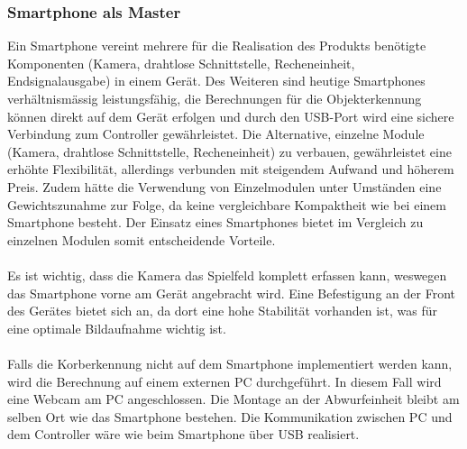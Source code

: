 \subsubsection{Smartphone als Master}
	Ein Smartphone vereint mehrere für die Realisation des Produkts benötigte 
	Komponenten (Kamera, drahtlose Schnittstelle, Recheneinheit, Endsignalausgabe) 
	in einem Gerät. Des Weiteren sind heutige Smartphones verhältnismässig 
	leistungsfähig, die Berechnungen für die Objekterkennung können direkt auf 
	dem Gerät erfolgen und durch den USB-Port wird eine sichere Verbindung zum 
	Controller gewährleistet. Die Alternative, einzelne Module (Kamera, drahtlose 
	Schnittstelle, Recheneinheit) zu verbauen, gewährleistet eine erhöhte 
	Flexibilität, allerdings verbunden mit steigendem Aufwand und höherem Preis. 
	Zudem hätte die Verwendung von Einzelmodulen unter Umständen eine 
	Gewichtszunahme zur Folge, da keine vergleichbare Kompaktheit wie bei einem 
	Smartphone besteht. Der Einsatz eines Smartphones bietet im Vergleich zu 
	einzelnen Modulen somit entscheidende Vorteile.\\
	\\
	Es ist wichtig, dass die Kamera das Spielfeld komplett erfassen kann, 
	weswegen das Smartphone vorne am Gerät angebracht wird. Eine Befestigung 
	an der Front des Gerätes bietet sich an, da dort eine hohe Stabilität 
	vorhanden ist, was für eine optimale Bildaufnahme wichtig ist.\\
	\\
	Falls die Korberkennung nicht auf dem Smartphone implementiert werden kann, 
	wird die Berechnung auf einem externen PC durchgeführt. In diesem Fall wird 
	eine Webcam am PC angeschlossen. Die Montage an der Abwurfeinheit bleibt am 
	selben Ort wie das Smartphone bestehen. Die Kommunikation zwischen PC und 
	dem Controller wäre wie beim Smartphone über USB realisiert.
